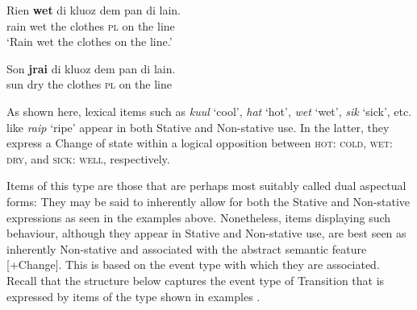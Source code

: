 \ex 
\gll Rien \textbf{wet} di kluoz dem pan di lain.\\
 rain wet the clothes \textsc{pl} on the line\\
\glt `{Rain wet the clothes on the line}.'

\ex 
\gll Son \textbf{jrai} di kluoz dem pan di lain.\\
 sun dry the clothes \textsc{pl} on the line\\
\z
\z


\ea%
\label{ex:5:11}


\z
\z

As shown here, lexical items such as \textit{kuul} `cool', \textit{hat} `hot', \textit{wet} `wet', \textit{sik} `sick', etc. like \textit{raip} `ripe' appear in both Stative and Non-stative use. In the latter, they express a Change of state within a logical opposition between \textsc{hot: cold}, \textsc{wet: dry}, and \textsc{sick: well}, respectively. 

Items of this type are those that are perhaps most suitably called dual aspectual forms: They may be said to inherently allow for both the Stative and Non-stative expressions as seen in the examples above. Nonetheless, items displaying such behaviour, although they appear in Stative and Non-stative use, are best seen as inherently Non-stative and associated with the abstract semantic feature [+Change]. This is based on the event type with which they are associated. Recall that the structure below captures the event type of Transition that is expressed by items of the type shown in examples . 

